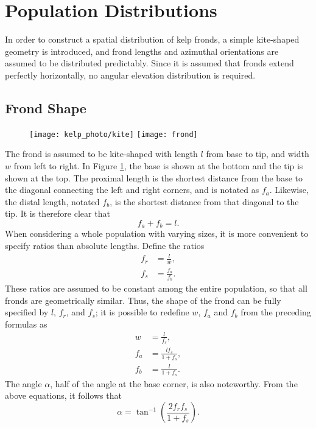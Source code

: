 \section{Population Distributions}
In order to construct a spatial distribution of kelp fronds, a simple kite-shaped geometry is introduced,
and frond lengths and azimuthal orientations are assumed to be distributed predictably.
Since it is assumed that fronds extend perfectly horizontally, no angular elevation distribution is required.

\subsection{Frond Shape}
\label{sec:shape}

\begin{figure}[h]
	\centering
  \texttt{[image: kelp\_photo/kite]}
  \qquad
	\texttt{[image: frond]}
	\label{fig:frond}
\end{figure}

The frond is assumed to be kite-shaped with length $l$ from base to tip, and width $w$ from left to right.
In Figure \ref{fig:frond}, the base is shown at the bottom and the tip is shown at the top.
The proximal length is the shortest distance from the base to the diagonal connecting the left and right corners, and is notated as $f_a$.
Likewise, the distal length, notated $f_b$, is the shortest distance from that diagonal to the tip.
It is therefore clear that
 \begin{equation*}
	 f_a + f_b = l.
 \end{equation*}
When considering a whole population with varying sizes, it is more convenient to specify ratios than absolute lengths.
Define the ratios
\begin{align*}
	f_r &= \frac{l}{w}, \\
	f_s &= \frac{f_a}{f_b}.
\end{align*}
These ratios are assumed to be constant among the entire population, so that all fronds are geometrically similar.
Thus, the shape of the frond can be fully specified by $l$, $f_r$, and $f_s$;
it is possible to redefine $w$, $f_a$ and $f_b$ from the preceding formulas as
\begin{align*}
	w &= \frac{l}{f_r}, \\
	f_a &= \frac{lf_s}{1+f_s}, \\
	f_b &= \frac{l}{1+f_s}.
\end{align*}
The angle $\alpha$, half of the angle at the base corner, is also noteworthy.
From the above equations, it follows that
\begin{equation*}
	\alpha = \tan^{-1}\left(\frac{2f_rf_s}{1+f_s}\right).
\end{equation*}

